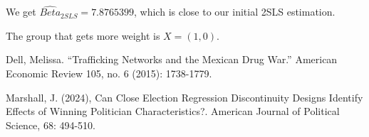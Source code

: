 \documentclass{article}
\begin{document}



We get \(\hat{Beta}_{2SLS} =7.8765399\), which is close to our initial 2SLS estimation.

The group that gets more weight is \(X=(1,0)\).


\begin{thebibliography}{9}

Dell, Melissa. “Trafficking Networks and the Mexican Drug War.” American Economic Review 105, no. 6 (2015): 1738-1779.

Marshall, J. (2024), Can Close Election Regression Discontinuity Designs Identify Effects of Winning Politician Characteristics?. American Journal of Political Science, 68: 494-510.

\end{thebibliography}
\end{document}
